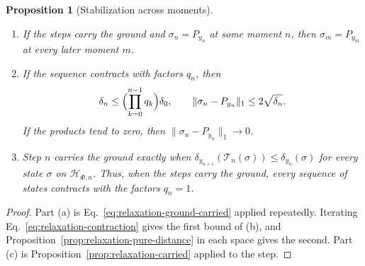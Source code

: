 \documentclass[11pt]{article}
\newtheorem{proposition}{Proposition}[section]
\theoremstyle{definition}
\begin{document}
\begin{proposition}[Stabilization across moments]
\label{prop:relaxation-moments}
\begin{enumerate}
\item[(a)] If the steps carry the ground and $\sigma_n=P_{y_n}$ at some moment $n$, then $\sigma_m=P_{y_m}$ at every later moment $m$.
\item[(b)] If the sequence contracts with factors $q_n$, then
\begin{equation}
 \delta_n\le\Bigl(\prod_{k=0}^{n-1}q_k\Bigr)\delta_0,
 \qquad \|\sigma_n-P_{y_n}\|_1\le2\sqrt{\delta_n}.
 \label{eq:relaxation-product}
\end{equation}
If the products tend to zero, then $\|\sigma_n-P_{y_n}\|_1\to0$.
\item[(c)] Step $n$ carries the ground exactly when $\delta_{y_{n+1}}(\mathcal T_n(\sigma))\le\delta_{y_n}(\sigma)$ for every state $\sigma$ on $\mathcal H_{\Phi,n}$. Thus, when the steps carry the ground, every sequence of states contracts with the factors $q_n=1$.
\end{enumerate}
\end{proposition}
\begin{proof}
Part (a) is Eq.~\eqref{eq:relaxation-ground-carried} applied repeatedly. Iterating Eq.~\eqref{eq:relaxation-contraction} gives the first bound of (b), and Proposition~\ref{prop:relaxation-pure-distance} in each space gives the second. Part (c) is Proposition~\ref{prop:relaxation-carried} applied to the step.
\end{proof}
\end{document}
